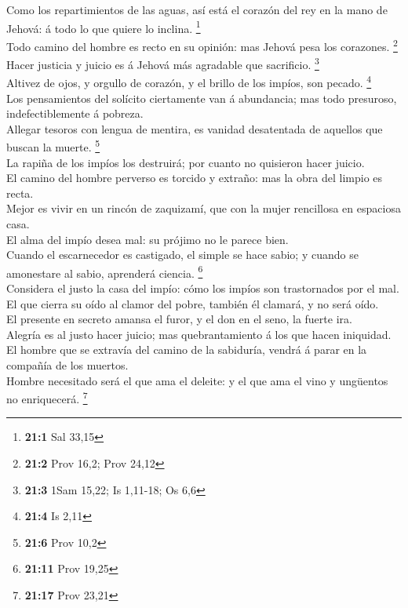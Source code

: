  Como los repartimientos de las aguas, así está el corazón
del rey en la mano de Jehová: á todo lo que quiere lo inclina.
\footnote{\textbf{21:1} Sal 33,15}\\
 Todo camino del hombre es recto en su opinión: mas Jehová
pesa los corazones. \footnote{\textbf{21:2} Prov 16,2; Prov 24,12}\\
 Hacer justicia y juicio es á Jehová más agradable que
sacrificio. \footnote{\textbf{21:3} 1Sam 15,22; Is 1,11-18; Os 6,6}\\
 Altivez de ojos, y orgullo de corazón, y el brillo de los
impíos, son pecado. \footnote{\textbf{21:4} Is 2,11}\\
 Los pensamientos del solícito ciertamente van á abundancia;
mas todo presuroso, indefectiblemente á pobreza.\\
 Allegar tesoros con lengua de mentira, es vanidad
desatentada de aquellos que buscan la muerte. \footnote{\textbf{21:6}
  Prov 10,2}\\
 La rapiña de los impíos los destruirá; por cuanto no
quisieron hacer juicio.\\
 El camino del hombre perverso es torcido y extraño: mas la
obra del limpio es recta.\\
 Mejor es vivir en un rincón de zaquizamí, que con la mujer
rencillosa en espaciosa casa.\\
 El alma del impío desea mal: su prójimo no le parece
bien.\\
 Cuando el escarnecedor es castigado, el simple se hace
sabio; y cuando se amonestare al sabio, aprenderá ciencia. \footnote{\textbf{21:11}
  Prov 19,25}\\
 Considera el justo la casa del impío: cómo los impíos son
trastornados por el mal.\\
 El que cierra su oído al clamor del pobre, también él
clamará, y no será oído.\\
 El presente en secreto amansa el furor, y el don en el
seno, la fuerte ira.\\
 Alegría es al justo hacer juicio; mas quebrantamiento á
los que hacen iniquidad.\\
 El hombre que se extravía del camino de la sabiduría,
vendrá á parar en la compañía de los muertos.\\
 Hombre necesitado será el que ama el deleite: y el que ama
el vino y ungüentos no enriquecerá. \footnote{\textbf{21:17} Prov 23,21}\\
